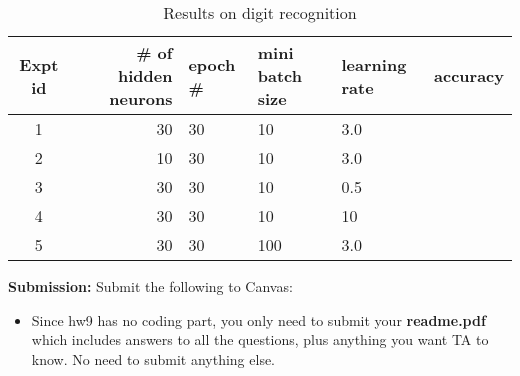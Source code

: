 \documentclass[11pt]{article}
\begin{document}
\begin{table}[h]
\centering
\caption{Results on digit recognition}
\label{table1}
\begin{tabular}{|c|r|l|l|l|r|} \hline

  Expt id & \# of hidden neurons & epoch \# & mini batch size & learning rate & accuracy \\ \hline
  1  & 30   & 30 & 10 & 3.0 &  \\ \hline
  2  & 10   & 30 & 10 & 3.0 &  \\ \hline
  3  & 30   & 30 & 10 & 0.5 &  \\ \hline
  4  & 30   & 30 & 10 & 10  &  \\ \hline       
  5  & 30   & 30 & 100 & 3.0 &  \\ \hline       

\end{tabular}
\end{table}  
           

           

           





\vspace{0.5 in}
\hspace{-0.3in}
{\bf Submission:}  Submit the following to Canvas:

\begin{itemize}
\item Since hw9 has no coding part, you only need to submit your {\bf readme.pdf}
  which includes answers to all the questions, plus anything you want
  TA to know. No need to submit anything else. 
  
\end{itemize}
\end{document}
